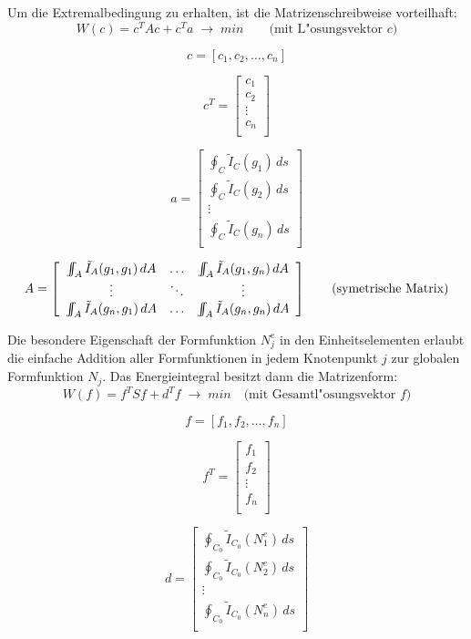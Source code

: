 Um die Extremalbedingung zu erhalten, ist die Matrizenschreibweise vorteilhaft:
$$W(c)=c^T A c + c^T a \;\rightarrow\; min \qquad \mbox{(mit L"osungsvektor $c$)}$$
\parbox{4cm}{$$c=\left[c_1, c_2, \ldots, c_n \right]$$} \hfill
\parbox{3cm}{$$c^T=\left[\begin{array}{c} c_1\\ c_2\\ \vdots \\ c_n\\
             \end{array}\right]$$} \hfill
\parbox{4cm}{$$a=\left[\begin{array}{c} \oint_C \tilde{I}_C (g_1)\, ds \\
   \oint_C \tilde{I}_C (g_2)\, ds \\ \vdots \\ \oint_C \tilde{I}_C (g_n)\, ds \\
   \end{array} \right] $$}

$$A=\left[\begin{array}{ccc}
 \IINT_A\tilde{I}_A(g_1,g_1)\, dA & \ldots & \IINT_A\tilde{I}_A(g_1,g_n)\, dA \\
          \vdots                  & \ddots &            \vdots              \\
 \IINT_A\tilde{I}_A(g_n,g_1)\, dA & \ldots & \IINT_A\tilde{I}_A(g_n,g_n)\, dA \\
 \end{array}\right] \qquad \mbox{(symetrische Matrix)}$$


Die besondere Eigenschaft der Formfunktion $N_j^e$ in den Einheitselementen
erlaubt die einfache Addition aller Formfunktionen in jedem Knotenpunkt $j$ zur
globalen Formfunktion $N_j$. Das Energieintegral besitzt dann die Matrizenform:
$$W(f)=f^T S f + d^T f \;\rightarrow\; min \quad \mbox{(mit Gesamtl"osungsvektor $f$)}$$
\parbox{4cm}{$$f=\left[f_1, f_2, \ldots, f_n \right]$$} \hfill
\parbox{2.5cm}{$$f^T=\left[\begin{array}{c} f_1\\ f_2\\ \vdots \\ f_n\\
             \end{array}\right]$$} \hfill
\parbox{4.5cm}{$$d=\left[\begin{array}{c} \oint_{C_0} \tilde{I}_{C_0} (N_1^e)\, ds \\
   \oint_{C_0} \tilde{I}_{C_0} (N^e_2)\, ds \\ \vdots \\ \oint_{C_0} \tilde{I}_{C_0} (N^e_n)\, ds \\
   \end{array} \right] $$}

